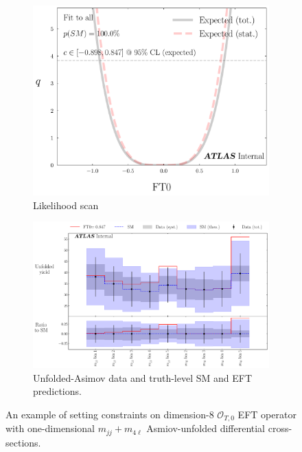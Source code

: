 \begin{figure}[!htb]
    \centering
    \begin{subfigure}{.49\textwidth}
        \centering
        \includegraphics[width=.8\linewidth]{figures/Results/EFT/Likelihood_profile_FT0_all_SR_SM_fixed.pdf}
        \caption{ Likelihood scan \label{fig:EFT_Example_LikelihoodScan}}
    \end{subfigure}
    \begin{subfigure}{.49\textwidth}
        \centering
        \includegraphics[width=.99\linewidth]{figures/Results/EFT/Unfolded_spectrum_FT0_all_SR_SM_fixed.pdf}
        \caption{ Unfolded-Asimov data and truth-level SM and EFT predictions.\label{fig:EFT_Example_MaxValue} }
    \end{subfigure}
    \caption{ An example of setting constraints on dimension-8 $\mathcal{O}_{T,0}$ EFT operator with one-dimensional $m_{jj}+m_{4\ell}$ Asmiov-unfolded differential cross-sections.  \label{fig:EFT_Example}}
\end{figure}

